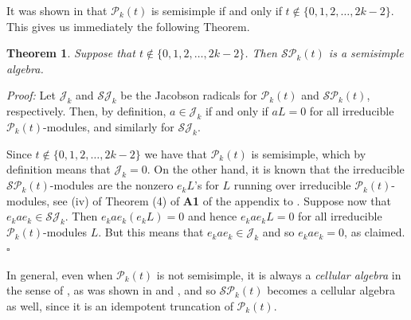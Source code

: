 \documentclass[10pt,hidelinks]{article}
\newcommand{\ParAlg}{{\mathcal P }_{k}}
\newcommand{\SpheAlg}{{\mathcal{SP} }_{k}}
\newtheorem{theorem}{Theorem}
\newenvironment{dem}{\noindent \textit{Proof:} }{\quad \hfill $\square$}
\numberwithin{equation}{section}
\begin{document}
\medskip
It was shown in \cite{PMartin1} that 
$ \ParAlg(t) $ is semisimple if and only if $ t \notin \{ 0, 1, 2, \ldots, 2k -2 \} $. 
This gives us immediately the following Theorem.
\begin{theorem}\label{semisimple}
  Suppose that $ t \notin \{ 0, 1, 2, \ldots, 2k -2 \} $. Then $\SpheAlg(t)$
  is a semisimple algebra. 
\end{theorem}
\begin{dem}
  Let $ \mathcal{J}_k $ and $ \mathcal{SJ}_k $ be the Jacobson radicals for $ \ParAlg(t) $ and
  $\SpheAlg(t)$, respectively. Then, by definition, $ a \in \mathcal{J}_k $ if and only if $ a L = 0 $ for all
  irreducible $ \ParAlg(t) $-modules, and similarly for $ \mathcal{SJ}_k $.

  \medskip Since $ t \notin \{ 0, 1, 2, \ldots, 2k -2 \} $ we have that $ \ParAlg(t) $ is semisimple, which by definition means that
  $ \mathcal{J}_k =0 $. On the other hand, it is known that the irreducible $\SpheAlg(t)$-modules are the nonzero
  $  e_k L $'s for $ L $ running over irreducible $ \ParAlg(t) $-modules, see (iv) of Theorem (4) of {\bf A1} of the appendix to \cite{Donkin}. 
  Suppose now that $ e_k a e_k \in \mathcal{SJ}_k$. Then $ e_k a e_k (e_k L)=0 $ and hence
  $ e_k a e_k  L=0 $ for all irreducible
  $ \ParAlg(t) $-modules $L$. But this means that $ e_k a e_k \in \mathcal{J}_k $ and so $ e_k a e_k =0 $, as claimed.
\end{dem}  

\medskip

In general, even when $  \ParAlg(t) $ is not semisimple, it is always a {\it cellular algebra} in the sense of \cite{GL},
as was shown in \cite{DW} and \cite{Xi}, 
and so $\SpheAlg(t)$
becomes a cellular algebra as well, since
it is an idempotent truncation of $ \ParAlg(t) $. 
\end{document}
